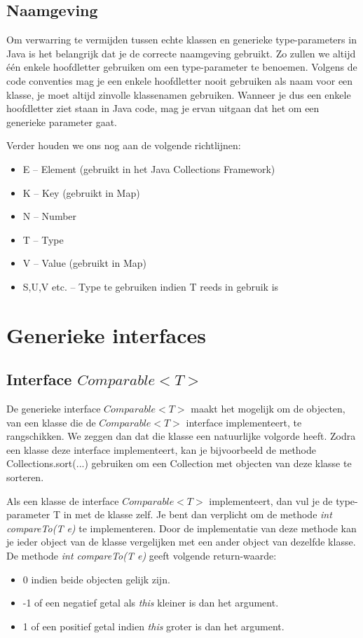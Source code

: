 \documentclass{tstextbook}
\begin{document}
\subsection{Naamgeving}

Om verwarring te vermijden tussen echte klassen en generieke  type-parameters in Java is het belangrijk dat je de correcte naamgeving gebruikt. Zo zullen we altijd \'e\'en enkele hoofdletter gebruiken om een type-parameter te benoemen.
Volgens de code conventies mag je een enkele hoofdletter nooit gebruiken als naam voor een klasse, je moet altijd zinvolle klassenamen gebruiken.
Wanneer je dus een enkele hoofdletter ziet staan in Java code, mag je ervan uitgaan dat het om een generieke parameter gaat. 

Verder houden we ons nog aan de volgende richtlijnen:

\begin{itemize}
\item E – Element (gebruikt in het Java Collections Framework)
\item K – Key (gebruikt in Map)
\item N – Number
\item T – Type
\item V – Value (gebruikt in Map)
\item S,U,V etc. – Type te gebruiken indien T reeds in gebruik is
\end{itemize}

\section{Generieke interfaces}

\subsection{Interface $Comparable<T>$}

De generieke interface $Comparable<T>$ maakt het mogelijk om de objecten, van een klasse die de $Comparable<T>$ interface implementeert, te rangschikken. We zeggen dan dat die klasse een natuurlijke volgorde heeft.
Zodra een klasse deze interface implementeert, kan je bijvoorbeeld de methode Collections.sort(...) gebruiken om een Collection met objecten van deze klasse te sorteren. 

Als een klasse de interface $Comparable<T>$ implementeert, dan vul je de type-parameter T in met de klasse zelf. Je bent dan verplicht om de methode \textit{int compareTo(T e)}  te implementeren. Door de implementatie van deze methode kan je ieder object van de klasse vergelijken met een ander object van dezelfde klasse. 
De methode \textit{int compareTo(T e)} geeft volgende return-waarde:
\begin{itemize}
\item 0 indien beide objecten gelijk zijn.
\item -1 of een negatief getal als \textit{this} kleiner is dan het argument.
\item 1 of een positief getal indien \textit{this} groter is dan het argument.
\end{itemize}
\end{document}

